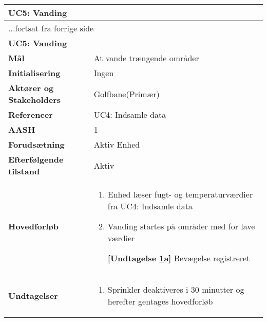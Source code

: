 \begin{center} \centering \label{UC5} 
	\begin{longtable}{|p{5cm}|p{9cm}|}  %
	\hline
		\multicolumn{2}{|l|}{\textbf{UC5: Vanding}} 		\\\hline %
		\endfirsthead
		
		\multicolumn{2}{l}{...fortsat fra forrige side} 	\\ \hline %
		\multicolumn{2}{|l|}{\textbf{UC5: Vanding}} 		\\\hline %
		\endhead	
		
		\textbf{Mål}								&At vande trængende områder	\\\hline
		\textbf{Initialisering}					&Ingen						\\\hline
		\textbf{Aktører og Stakeholders}			&Golfbane(Primær)			\\\hline
		\textbf{Referencer}						&UC4: Indsamle data 			\\\hline
		\textbf{AASH}							&1							\\\hline
		\textbf{Forudsætning}					&Aktiv Enhed					\\\hline
		\textbf{Efterfølgende tilstand}			&Aktiv						\\\hline
		\textbf{Hovedforløb}					
			&\begin{enumerate}
				
				\item Enhed læser fugt- og temperaturværdier fra UC4: Indsamle data
				
				\item \label{uc5sprinkler} Vanding startes på områder med for lave værdier
				
					\textbf{[Undtagelse \ref{uc5sprinkler}a]} Bevægelse registreret
	
			\end{enumerate}\\\hline

		\textbf{Undtagelser}
			&\begin{enumerate}[label=\ref{uc5sprinkler}a.]
			
				\item Sprinkler deaktiveres i 30 minutter og herefter gentages hovedforløb	
			
			\end{enumerate}\\\hline
	\end{longtable}
\end{center}

